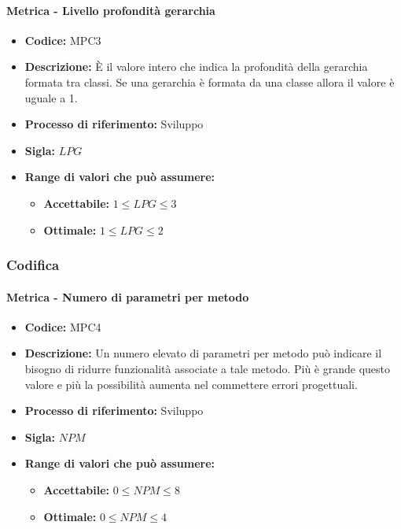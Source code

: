     \paragraph{Metrica - Livello profondità gerarchia}
    \begin{itemize}
        \item \textbf{Codice:} MPC3
        \item \textbf{Descrizione:} È il valore intero che indica la profondità della gerarchia formata tra classi. Se una gerarchia è formata da una classe allora il valore è uguale a 1.
        \item \textbf{Processo di riferimento:} Sviluppo
        \item \textbf{Sigla:} $LPG$
        \item \textbf{Range di valori che può assumere:}
        \begin{itemize}
            \item \textbf{Accettabile:} $1 \leq{} LPG \leq 3$
            \item \textbf{Ottimale:} $1 \leq{} LPG \leq 2$
        \end{itemize}
    \end{itemize}

\subsubsection{Codifica}  
    \paragraph{Metrica - Numero di parametri per metodo} 
    \begin{itemize}
        \item \textbf{Codice:} MPC4
        \item \textbf{Descrizione:} Un numero elevato di parametri per metodo può indicare il bisogno di ridurre funzionalità associate a tale metodo. Più è grande questo valore e più la possibilità aumenta nel commettere errori progettuali.
        \item \textbf{Processo di riferimento:} Sviluppo
        \item \textbf{Sigla:} $NPM$
        \item \textbf{Range di valori che può assumere:}
        \begin{itemize}
            \item \textbf{Accettabile:} $0 \leq{} NPM \leq 8$
            \item \textbf{Ottimale:} $0 \leq{} NPM \leq 4$
        \end{itemize}
    \end{itemize}

